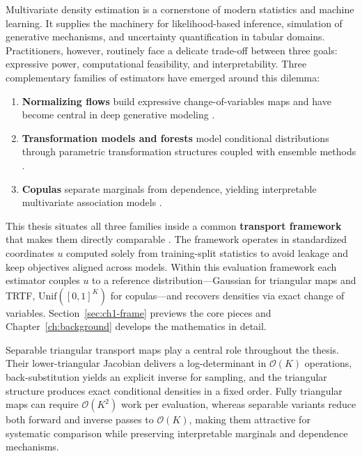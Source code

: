 \documentclass[11pt,a4paper,twoside]{book}\usepackage[]{graphicx}\usepackage[]{xcolor}
\begin{document}
Multivariate density estimation is a cornerstone of modern statistics and machine learning. It supplies the machinery for likelihood-based inference, simulation of generative mechanisms, and uncertainty quantification in tabular domains. Practitioners, however, routinely face a delicate trade-off between three goals: expressive power, computational feasibility, and interpretability. Three complementary families of estimators have emerged around this dilemma:
\begin{enumerate}
  \item \textbf{Normalizing flows} build expressive change-of-variables maps and have become central in deep generative modeling \citep{rezende2015variational,papamakarios2017masked,dinh2017real,durkan2019neural,kingma2018glow,papamakarios2021normalizing}.
  \item \textbf{Transformation models and forests} model conditional distributions through parametric transformation structures coupled with ensemble methods \citep{hothorn2017transformation,hothorn2018conditional,hothorn2021transformation}.
  \item \textbf{Copulas} separate marginals from dependence, yielding interpretable multivariate association models \citep{sklar1959fonctions,nelsen2006introduction,joe2014dependence,nagler2017kdecopula}.
\end{enumerate}

This thesis situates all three families inside a common \textbf{transport framework} that makes them directly comparable \citep{rosenblatt1952remarks,knothe1957contributions,bogachev2005triangular,ramgraber2025friendly}. The framework operates in standardized coordinates $u$ computed solely from training-split statistics to avoid leakage and keep objectives aligned across models. Within this evaluation framework each estimator couples $u$ to a reference distribution---Gaussian for triangular maps and TRTF, $\mathrm{Unif}([0,1]^K)$ for copulas---and recovers densities via exact change of variables. Section~\ref{sec:ch1-frame} previews the core pieces and Chapter~\ref{ch:background} develops the mathematics in detail.

Separable triangular transport maps play a central role throughout the thesis. Their lower-triangular Jacobian delivers a log-determinant in $\mathcal{O}(K)$ operations, back-substitution yields an explicit inverse for sampling, and the triangular structure produces exact conditional densities in a fixed order. Fully triangular maps can require $\mathcal{O}(K^2)$ work per evaluation, whereas separable variants reduce both forward and inverse passes to $\mathcal{O}(K)$, making them attractive for systematic comparison while preserving interpretable marginals and dependence mechanisms.
\end{document}

